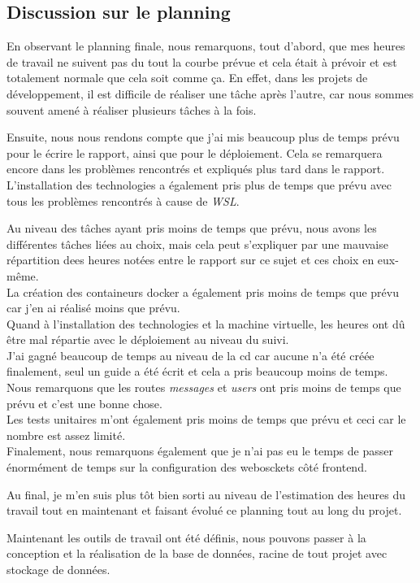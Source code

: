 \documentclass[
    iai, %
    il, %
]{heig-tb}
\begin{document}
\subsection{Discussion sur le planning}
En observant le planning finale, nous remarquons, tout d'abord, que mes heures de travail ne suivent pas du tout la courbe prévue et cela était à prévoir et est totalement normale que cela soit comme ça. En effet, dans les projets de développement, il est difficile de réaliser une tâche après l'autre, car nous sommes souvent amené à réaliser plusieurs tâches à la fois.

Ensuite, nous nous rendons compte que j'ai mis beaucoup plus de temps prévu pour le écrire le rapport, ainsi que pour le déploiement. Cela se remarquera encore dans les problèmes rencontrés et expliqués plus tard dans le rapport. L'installation des technologies a également pris plus de temps que prévu avec tous les problèmes rencontrés à cause de \emph{WSL}.

Au niveau des tâches ayant pris moins de temps que prévu, nous avons les différentes tâches liées au choix, mais cela peut s'expliquer par une mauvaise répartition dees heures notées entre le rapport sur ce sujet et ces choix en eux-même. \\
La création des containeurs \Gls{docker} a également pris moins de temps que prévu car j'en ai réalisé moins que prévu. \\
Quand à l'installation des technologies et la machine virtuelle, les heures ont dû être mal répartie avec le déploiement au niveau du suivi. \\
J'ai gagné beaucoup de temps au niveau de la \Gls{cd} car aucune n'a été créée finalement, seul un guide a été écrit et cela a pris beaucoup moins de temps.
Nous remarquons que les routes \emph{messages} et \emph{users} ont pris moins de temps que prévu et c'est une bonne chose. \\
Les tests unitaires m'ont également pris moins de temps que prévu et ceci car le nombre est assez limité. \\
Finalement, nous remarquons également que je n'ai pas eu le temps de passer énormément de temps sur la configuration des webosckets côté \Gls{frontend}.

Au final, je m'en suis plus tôt bien sorti au niveau de l'estimation des heures du travail tout en maintenant et faisant évolué ce planning tout au long du projet.

Maintenant les outils de travail ont été définis, nous pouvons passer à la conception et la réalisation de la base de données, racine de tout projet avec stockage de données.
\end{document}
